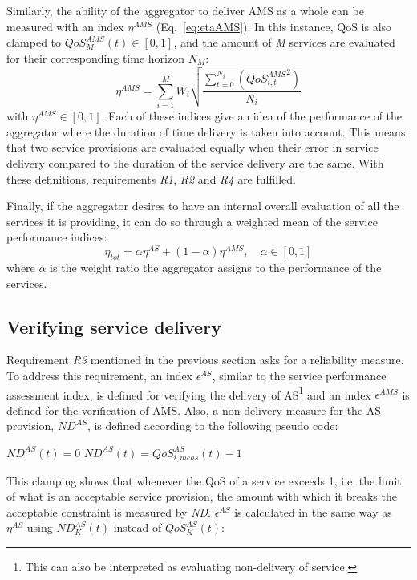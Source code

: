 Similarly, the ability of the aggregator to deliver AMS as a whole can be measured with an index $\eta^{AMS}$ (Eq.~\eqref{eq:etaAMS}). In this instance, QoS is also clamped to $QoS^{AMS}_{M}(t) \in [0,1]$, and the amount of \emph{M} services are evaluated for their corresponding time horizon $N_M$:
\begin{equation}\label{eq:etaAMS}
\eta^{AMS} = \sum^{M}_{i=1} W_i \sqrt{\frac{\sum^{N_i}_{t=0} \left( {QoS^{AMS}_{i,t}}^{2} \right)}{N_i}}
\end{equation}
with $\eta^{AMS} \in [0,1]$. Each of these indices give an idea of the performance of the aggregator where the duration of time delivery is taken into account. This means that two service provisions are evaluated equally when their error in service delivery compared to the duration of the service delivery are the same. With these definitions, requirements \emph{R1}, \emph{R2} and \emph{R4} are fulfilled.

Finally, if the aggregator desires to have an internal overall evaluation of all the services it is providing, it can do so through a weighted mean of the service performance indices:
\begin{equation}
\eta_{tot} = \alpha \eta^{AS} + (1-\alpha) \eta^{AMS}, \quad \alpha \in [0,1]
\end{equation}
where $\alpha$ is the weight ratio the aggregator assigns to the performance of the services.

\subsection{Verifying service delivery}
Requirement \emph{R3} mentioned in the previous section asks for a reliability measure. To address this requirement, an index $\epsilon^{AS}$, similar to the service performance assessment index, is defined for verifying the delivery of AS\footnote{This can also be interpreted as evaluating non-delivery of service.} and an index $\epsilon^{AMS}$ is defined for the verification of AMS. Also, a non-delivery measure for the AS provision, $ND^{AS}$, is defined according to the following pseudo code:

\begin{algorithmic}[H]
        \STATE $ND^{AS}(t) = 0$ 
    \ELSE 
        \STATE $ND^{AS}(t) = QoS^{AS}_{i,meas}(t)-1$
    \ENDIF
\ENDFOR
\ENDFOR
\end{algorithmic}
This clamping shows that whenever the QoS of a service exceeds 1, i.e. the limit of what is an acceptable service provision, the amount with which it breaks the acceptable constraint is measured by \emph{ND}.
$\epsilon^{AS}$ is calculated in the same way as $\eta^{AS}$ using $ND^{AS}_K(t)$ instead of $QoS^{AS}_{K}(t)$:

